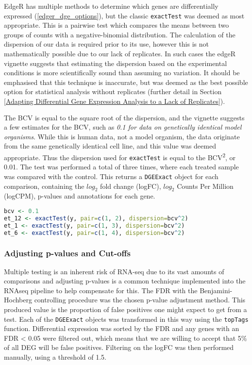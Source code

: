 EdgeR has multiple methods to determine which genes are differentially expressed (\autoref{edger_dge_options}), but the classic \texttt{exactTest} was deemed as most appropriate. This is a pairwise test which compares the means between two groups of counts with a negative-binomial distribution. The calculation of the dispersion of our data is required prior to its use, however this is not mathematically possible due to our lack of replicates. In such cases the edgeR vignette suggests that estimating the dispersion based on the experimental conditions is more scientifically sound than assuming no variation. It should be emphasised that this technique is inaccurate, but was deemed as the best possible option for statistical analysis without replicates (further detail in Section \ref{Adapting Differential Gene Expression Analysis to a Lack of Replicates}).

The \ac{BCV} is equal to the square root of the dispersion, and the vignette suggests a few estimates for the \ac{BCV}, such as \textit{0.1 for data on genetically identical model organisms}. While this is human data, not a model organism, the data originate from the same genetically identical cell line, and this value was deemed appropriate. Thus the dispersion used for \texttt{exactTest} is equal to the BCV\textsuperscript{2}, or 0.01. 
The test was performed a total of three times, where each treated sample was compared with the control. This returns a \texttt{DGEExact} object for each comparison, containing the $log_{2}$ fold change (logFC), $log_{2}$ Counts Per Million (logCPM), p-values and annotations for each gene. 

\begin{lstlisting}[language=R, caption=Exact test function]
bcv <- 0.1
et_12 <- exactTest(y, pair=c(1, 2), dispersion=bcv^2)
et_1 <- exactTest(y, pair=c(1, 3), dispersion=bcv^2)
et_6 <- exactTest(y, pair=c(1, 4), dispersion=bcv^2)
\end{lstlisting}

\subsubsection{Adjusting p-values and Cut-offs}

Multiple testing is an inherent risk of RNA-seq due to its vast amounts of comparisons and adjusting p-values is a common technique implemented into the RNAseq pipeline to help compensate for this.  The \ac{FDR} with the Benjamini-Hochberg controlling procedure \citep{benjamini1995controlling} was the chosen p-value adjustment method. This produced value is the proportion of false positives one might expect to get from a test. Each of the \texttt{DGEExact} objects was transformed in this way using the \texttt{topTags} function. Differential expression was sorted by the \ac{FDR} and any genes with an \ac{FDR} < 0.05 were filtered out, which means that we are willing to accept that 5\% of all \ac{DEG} will be false positives. Filtering on the \ac{logFC} was then performed manually, using a threshold of 1.5.  


